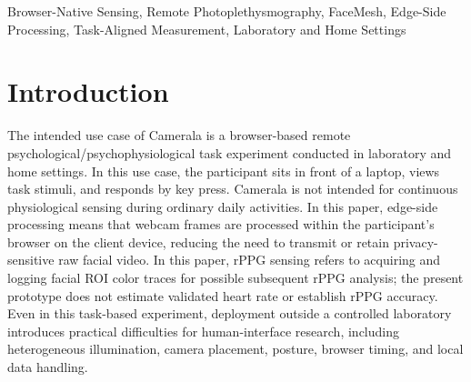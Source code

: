 \documentclass[dvipdfmx]{ehis}
\begin{document}
\begin{abstract}
Camerala is an edge-side, browser-native framework for remote psychophysiological experiments with rPPG sensing.
It synchronizes task events with face-image-derived feature records and exports local CSV/ZIP files without transmitting or storing raw facial video.
An exploratory N=1 author-participant deployment was evaluated as a 10-session, 600-trial browser-based task experiment in laboratory and home settings.
The deployment was assessed against a study-specific exploratory 80\% behavioral-response reference level and temporally alignable export of task-event and face-image-derived records.
Of 600 completed trials, 541 (90.2\%) had reaction times within 100--1500 ms; timestamped task-event and face-image-derived records were exported for all 10 sessions, with laboratory/home differences treated only as deployment-context differences.
These findings are limited to the tested author-participant and configuration and do not establish general feasibility, robustness, validity in other settings, rPPG accuracy, or psychological/physiological effects.
\end{abstract}

\begin{keyword}
Browser-Native Sensing, Remote Photoplethysmography, FaceMesh, Edge-Side Processing, Task-Aligned Measurement, Laboratory and Home Settings
\end{keyword}

\maketitle

\section{Introduction}

The intended use case of Camerala is a browser-based remote psychological/psychophysiological task experiment conducted in laboratory and home settings.
In this use case, the participant sits in front of a laptop, views task stimuli, and responds by key press.
Camerala is not intended for continuous physiological sensing during ordinary daily activities.
In this paper, edge-side processing means that webcam frames are processed within the participant's browser on the client device, reducing the need to transmit or retain privacy-sensitive raw facial video.
In this paper, rPPG sensing refers to acquiring and logging facial ROI color traces for possible subsequent rPPG analysis; the present prototype does not estimate validated heart rate or establish rPPG accuracy.
Even in this task-based experiment, deployment outside a controlled laboratory introduces practical difficulties for human-interface research, including heterogeneous illumination, camera placement, posture, browser timing, and local data handling.
\end{document}
